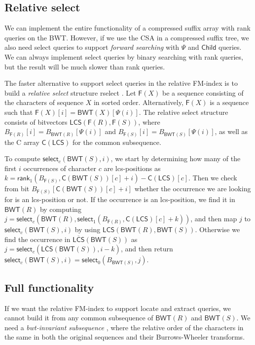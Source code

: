 \documentclass[a4paper,11pt]{llncs}
\renewcommand{\complement}[1]{\ensuremath{\overline{ #1 }}}
\newcommand{\BWT}{\textsf{BWT}}
\newcommand{\CSA}{\textsf{CSA}}
\newcommand{\mBWT}{\ensuremath{\mathsf{BWT}}}
\newcommand{\mF}{\ensuremath{\mathsf{F}}}
\newcommand{\C}{\textsf{C}}
\newcommand{\mC}{\ensuremath{\mathsf{C}}}
\newcommand{\mLCS}{\ensuremath{\mathsf{LCS}}}
\newcommand{\mCS}{\ensuremath{\complement{\mathsf{LCS}}}}
\newcommand{\rselect}{\textsf{rselect}}
\newcommand{\locate}{\textsf{locate}}
\newcommand{\extract}{\textsf{extract}}
\newcommand{\rank}{\textsf{rank}}
\newcommand{\select}{\textsf{select}}
\newcommand{\mPsi}{\ensuremath{\mathsf{\Psi}}}
\newcommand{\mrank}{\ensuremath{\mathsf{rank}}}
\newcommand{\mselect}{\ensuremath{\mathsf{select}}}
\newcommand{\mChild}{\ensuremath{\mathsf{Child}}}
\begin{document}
\subsection{Relative select}

We can implement the entire functionality of a compressed suffix array with \rank{} queries on the \BWT. However, if we use the \CSA{} in a compressed suffix tree, we also need \select{} queries to support \emph{forward searching} with $\mPsi$ and $\mChild$ queries. We can always implement \select{} queries by binary searching with \rank{} queries, but the result will be much slower than \rank{} queries.

The faster alternative to support \select{} queries in the relative FM-index is to build a \emph{relative select} structure \rselect{} \cite{Boucher2015}. Let $\mF(X)$ be a sequence consisting of the characters of sequence $X$ in sorted order. Alternatively, $\mF(X)$ is a sequence such that $\mF(X)[i] = \mBWT(X)[\mPsi(i)]$. The relative select structure consists of bitvectors $\mLCS(\mF(R), \mF(S))$, where $B_{\mF(R)}[i] = B_{\mBWT(R)}[\mPsi(i)]$ and $B_{\mF(S)}[i] = B_{\mBWT(S)}[\mPsi(i)]$, as well as the \C{} array $\mC(\mLCS)$ for the common subsequence.

To compute $\mselect_{c}(\mBWT(S), i)$, we start by determining how many of the first $i$ occurrences of character $c$ are lcs-positions as $k = \mrank_{1}(B_{\mF(S)}, \mC(\mBWT(S))[c] + i) - \mC(\mLCS)[c]$. Then we check from bit $B_{\mF(S)}[\mC(\mBWT(S))[c] + i]$ whether the occurrence we are looking for is an lcs-position or not. If the occurrence is an lcs-position, we find it in $\mBWT(R)$ by computing $j = \mselect_{c}(\mBWT(R), \mselect_{1}(B_{\mF(R)}, \mC(\mLCS)[c] + k))$, and then map $j$ to $\mselect_{c}(\mBWT(S), i)$ by using $\mLCS(\mBWT(R), \mBWT(S))$. Otherwise we find the occurrence in $\mCS(\mBWT(S))$ as $j = \mselect_{c}(\mCS(\mBWT(S)), i-k)$, and then return $\mselect_{c}(\mBWT(S), i) = \mselect_{0}(B_{\mBWT(S)}, j)$.

\subsection{Full functionality}

If we want the relative FM-index to support \locate{} and \extract{} queries, we cannot build it from any common subsequence of $\mBWT(R)$ and $\mBWT(S)$. We need a \emph{bwt-invariant subsequence} \cite{Belazzougui2014}, where the relative order of the characters in the same in both the original sequences and their Burrows-Wheeler transforms.
\end{document}
